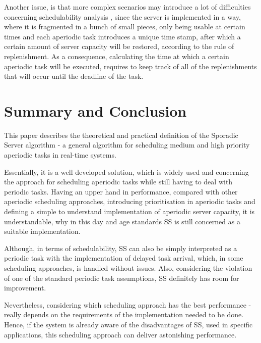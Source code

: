 \documentclass[conference]{IEEEtran}
\begin{document}
Another issue, is that more complex scenarios may introduce a lot of difficulties concerning schedulability analysis \cite{b1}, since the server is implemented in a way, where it is fragmented in a bunch of small pieces, only being usable at certain times and each aperiodic task introduces a unique time stamp, after which a certain amount of server capacity will be restored, according to the rule of replenishment. As a consequence, calculating the time at which a certain aperiodic task will be executed, requires to keep track of all of the replenishments that will occur until the deadline of the task.

\section{Summary and Conclusion}
This paper describes the theoretical and practical definition of the Sporadic Server algorithm - a general algorithm for scheduling medium and high priority aperiodic tasks in real-time systems. 

Essentially, it is a well developed solution, which is widely used and concerning the approach for scheduling aperiodic tasks while still having to deal with periodic tasks. Having an upper hand in performance, compared with other aperiodic scheduling approaches, introducing prioritisation in aperiodic tasks and defining a simple to understand implementation of aperiodic server capacity, it is understandable, why in this day and age standards SS is still concerned as a suitable implementation. 

Although, in terms of schedulability, SS can also be simply interpreted as a periodic task with the implementation of delayed task arrival, which, in some scheduling approaches, is handled without issues. Also, considering the violation of one of the standard periodic task assumptions, SS definitely has room for improvement. 

Nevertheless, considering which scheduling approach has the best performance - really depends on the requirements of the implementation needed to be done. Hence, if the system is already aware of the disadvantages of SS, used in specific applications, this scheduling approach can deliver astonishing performance.


\end{document}
